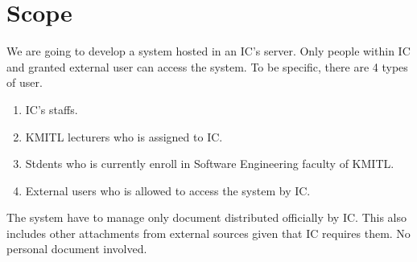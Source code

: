 \section{Scope}
We are going to develop a system hosted in an IC's server.
Only people within IC and granted external user can access the system.
To be specific, there are 4 types of user.
\begin{enumerate}
\item IC's staffs.
\item KMITL lecturers who is assigned to IC.
\item Stdents who is currently enroll in Software Engineering faculty of KMITL.
\item External users who is allowed to access the system by IC.
\end{enumerate}
The system have to manage only document distributed officially by IC.
This also includes other attachments from external sources given that IC requires them.
No personal document involved.
